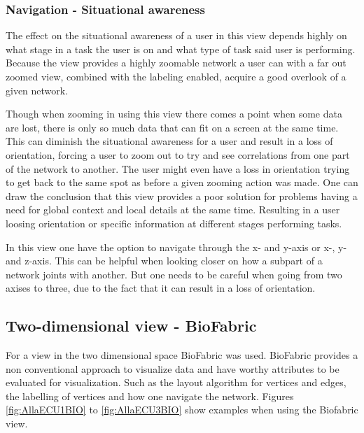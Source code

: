 \documentclass[a4paper,11pt]{kth-mag}
\begin{document}
\subsubsection{Navigation - Situational awareness}
The effect on the situational awareness of a user in this view depends highly on what stage in a task the user is on and what type of task said user is performing. Because the view
provides a highly zoomable network a user can with a far out zoomed view, combined with the labeling enabled, acquire a good overlook of a given network.

Though when zooming in using this view there comes a point when some data are lost, there
is only so much data that can fit on a screen at the same time. This can diminish the situational awareness for a user and result in
a loss of orientation, forcing a user to zoom out to try and see correlations from one part of the network to another. The user might even have a loss in orientation trying to get back to the same spot as before a given 
zooming action was made. One can draw the conclusion that this view provides a poor solution for problems having a need for global context and local details at the same time. Resulting in a user loosing orientation or 
specific information at different stages performing tasks.

In this view one have the option to navigate through the x- and y-axis or x-, y- and z-axis. This can be helpful when looking closer on how a subpart of a network joints with another. But one needs to be careful 
when going from two axises to three, due to the fact that it can result in a loss of orientation.

\subsection{Two-dimensional view - BioFabric}
For a view in the two dimensional space BioFabric was used. BioFabric provides a non conventional approach to visualize data and have worthy attributes to be evaluated for visualization. 
Such as the layout algorithm for vertices and edges, the labelling of vertices and how one navigate the network. Figures \ref{fig:AllaECU1BIO} to \ref{fig:AllaECU3BIO} show examples when using the Biofabric view.
 
\end{document}
